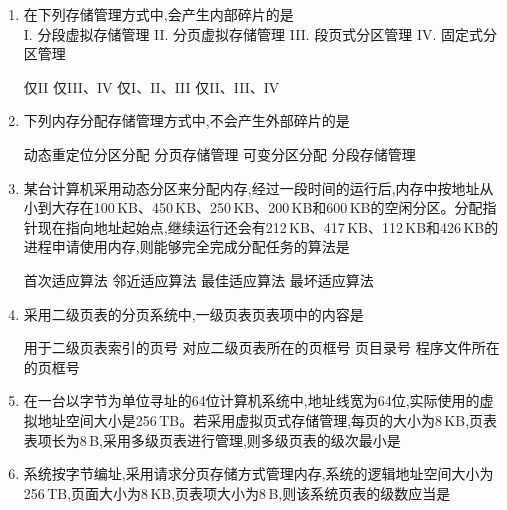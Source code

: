 \documentclass[12pt, a4paper, oneside, UTF8]{ctexbook}
\begin{document}
\begin{enumerate}
    \item 在下列存储管理方式中,会产生内部碎片的是\\
    I. 分段虚拟存储管理\quad
    II. 分页虚拟存储管理\quad
    III. 段页式分区管理\quad
    IV. 固定式分区管理
    \begin{choices}[2]
    \task 仅II
    \task 仅III、IV
    \task 仅I、II、III
    \task 仅II、III、IV
    \end{choices}

    \item 下列内存分配存储管理方式中,不会产生外部碎片的是
    \begin{choices}[1]
    \task 动态重定位分区分配
    \task 分页存储管理
    \task 可变分区分配
    \task 分段存储管理
    \end{choices}

    \item 某台计算机采用动态分区来分配内存,经过一段时间的运行后,内存中按地址从小到大存在100\,KB、450\,KB、250\,KB、200\,KB和600\,KB的空闲分区。分配指针现在指向地址起始点,继续运行还会有212\,KB、417\,KB、112\,KB和426\,KB的进程申请使用内存,则能够完全完成分配任务的算法是
    \begin{choices}[2]
    \task 首次适应算法
    \task 邻近适应算法
    \task 最佳适应算法
    \task 最坏适应算法
    \end{choices}

    \item 采用二级页表的分页系统中,一级页表页表项中的内容是
    \begin{choices}[2]
    \task 用于二级页表索引的页号
    \task 对应二级页表所在的页框号
    \task 页目录号
    \task 程序文件所在的页框号
    \end{choices}

    \item 在一台以字节为单位寻址的64位计算机系统中,地址线宽为64位,实际使用的虚拟地址空间大小是256\,TB。若采用虚拟页式存储管理,每页的大小为8\,KB,页表表项长为8\,B,采用多级页表进行管理,则多级页表的级次最小是
    \begin{choices}
    \end{choices}

    \item 系统按字节编址,采用请求分页存储方式管理内存,系统的逻辑地址空间大小为256\,TB,页面大小为8\,KB,页表项大小为8\,B,则该系统页表的级数应当是
    \begin{choices}
    \end{choices}


\end{enumerate}
\end{document}

